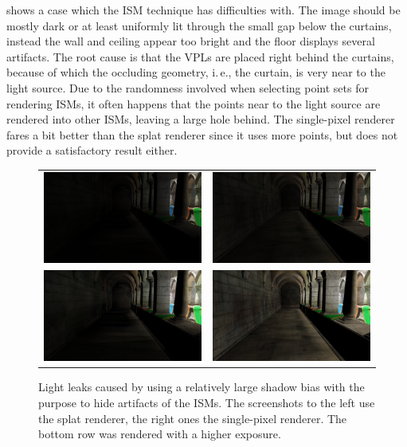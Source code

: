 \noindent
{} shows a case which the ISM technique has difficulties with. The image should be mostly dark or at least uniformly lit through the small gap below the curtains, instead the wall and ceiling appear too bright and the floor displays several artifacts. The root cause is that the VPLs are placed right behind the curtains, because of which the occluding geometry, i.\,e., the curtain, is very near to the light source. Due to the randomness involved when selecting point sets for rendering ISMs, it often happens that the points near to the light source are rendered into other ISMs, leaving a large hole behind. The single-pixel renderer fares a bit better than the splat renderer since it uses more points, but does not provide a satisfactory result either.



\begin{figure}[htb]
\centering
  \begin{tabular}{@{}cc@{}}
    \includegraphics[width=.48\textwidth]{screenshots/bias_splat} &
    \includegraphics[width=.48\textwidth]{screenshots/bias_single_pixel}\\
      \includegraphics[width=.48\textwidth]{screenshots/bias_splat_exposure} &
      \includegraphics[width=.48\textwidth]{screenshots/bias_single_pixel_exposure}
  \end{tabular}
  \caption{Light leaks caused by using a relatively large shadow bias with the purpose to hide artifacts of the ISMs. The screenshots to the left use the splat renderer, the right ones the single-pixel renderer. The bottom row was rendered with a higher exposure.}
  \label{fig:results:bias}
\end{figure}

